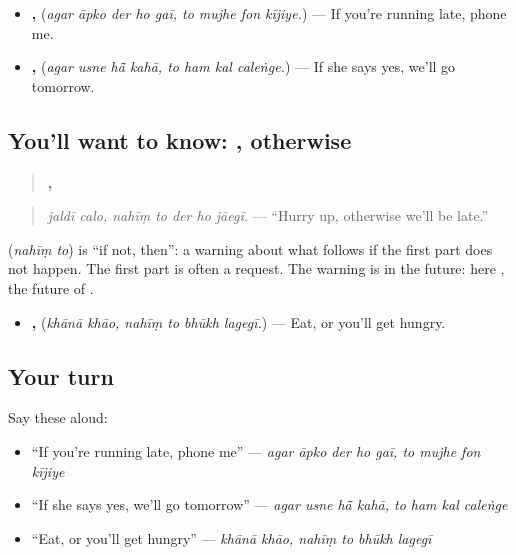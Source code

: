 \begin{itemize}
\raggedright
  \item \textbf{    ,    } (\emph{agar āpko der ho gaī, to mujhe fon kījiye.}) — If you're running late, phone me.
  \item \textbf{   ,    } (\emph{agar usne hā̃ kahā, to ham kal caleṅge.}) — If she says yes, we'll go tomorrow.
\end{itemize}

\subsection*{You'll want to know:  , otherwise}
\begin{quote}
\textbf{ ,     }
\end{quote}

\begin{quote}
\emph{jaldī calo, nahīṃ to der ho jāegī.} — \textquotedblleft{}Hurry up, otherwise we'll be late.\textquotedblright{}
\end{quote}

\textbf{ } (\emph{nahīṃ to}) is \textquotedblleft{}if not, then\textquotedblright{}: a warning about what follows if the first part does not happen. The first part is often a request. The warning is in the future: here \textbf{ }, the future of \textbf{ }.

\begin{itemize}
\raggedright
  \item \textbf{ ,    } (\emph{khānā khāo, nahīṃ to bhūkh lagegī.}) — Eat, or you'll get hungry.
\end{itemize}

\subsection*{Your turn}
Say these aloud:

\begin{itemize}
\raggedright
  \item \textquotedblleft{}If you're running late, phone me\textquotedblright{} — \emph{agar āpko der ho gaī, to mujhe fon kījiye}
  \item \textquotedblleft{}If she says yes, we'll go tomorrow\textquotedblright{} — \emph{agar usne hā̃ kahā, to ham kal caleṅge}
  \item \textquotedblleft{}Eat, or you'll get hungry\textquotedblright{} — \emph{khānā khāo, nahīṃ to bhūkh lagegī}
\end{itemize}

